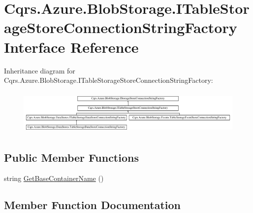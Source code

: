 \hypertarget{interfaceCqrs_1_1Azure_1_1BlobStorage_1_1ITableStorageStoreConnectionStringFactory}{}\section{Cqrs.\+Azure.\+Blob\+Storage.\+I\+Table\+Storage\+Store\+Connection\+String\+Factory Interface Reference}
\label{interfaceCqrs_1_1Azure_1_1BlobStorage_1_1ITableStorageStoreConnectionStringFactory}
Inheritance diagram for Cqrs.\+Azure.\+Blob\+Storage.\+I\+Table\+Storage\+Store\+Connection\+String\+Factory\+:\begin{figure}[H]
\begin{center}
\leavevmode
\includegraphics[height=2.231076cm]{interfaceCqrs_1_1Azure_1_1BlobStorage_1_1ITableStorageStoreConnectionStringFactory}
\end{center}
\end{figure}
\subsection*{Public Member Functions}
\begin{DoxyCompactItemize}
\item 
string \hyperlink{interfaceCqrs_1_1Azure_1_1BlobStorage_1_1ITableStorageStoreConnectionStringFactory_a1b9bfc9dcb7292e62619fc46e4a85982_a1b9bfc9dcb7292e62619fc46e4a85982}{Get\+Base\+Container\+Name} ()
\end{DoxyCompactItemize}


\subsection{Member Function Documentation}
\mbox{\label{interfaceCqrs_1_1Azure_1_1BlobStorage_1_1ITableStorageStoreConnectionStringFactory_a1b9bfc9dcb7292e62619fc46e4a85982_a1b9bfc9dcb7292e62619fc46e4a85982}} 
